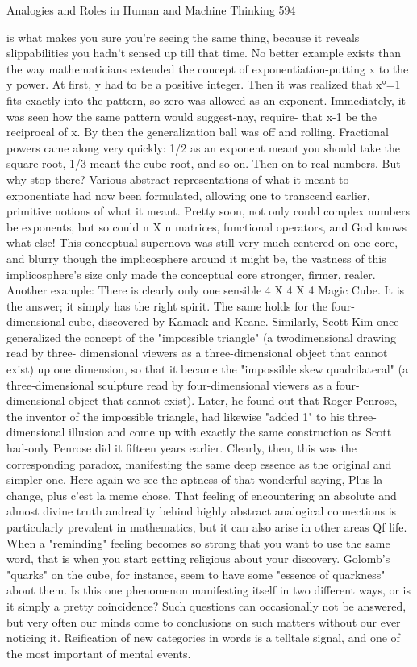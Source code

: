Analogies and Roles in Human and Machine Thinking                                 594

is what makes you sure you're seeing the same thing, because it reveals slippabilities
you hadn't sensed up till that time.
         No better example exists than the way mathematicians extended the concept of
exponentiation-putting x to the y power. At first, y had to be a positive integer. Then
it was realized that x°=1 fits exactly into the pattern, so zero was allowed as an
exponent. Immediately, it was seen how the same pattern would suggest-nay, require-
that x-1 be the reciprocal of x. By then the generalization ball was off and rolling.
Fractional powers came along very quickly: 1/2 as an exponent meant you should take
the square root, 1/3 meant the cube root, and so on. Then on to real numbers. But why
stop there? Various abstract representations of what it meant to exponentiate had now
been formulated, allowing one to transcend earlier, primitive notions of what it meant.
Pretty soon, not only could complex numbers be exponents, but so could n X n
matrices, functional operators, and God knows what else! This conceptual supernova
was still very much centered on one core, and blurry though the implicosphere around
it might be, the vastness of this implicosphere's size only made the conceptual core
stronger, firmer, realer.
         Another example: There is clearly only one sensible 4 X 4 X 4 Magic Cube. It
is the answer; it simply has the right spirit. The same holds for the four-dimensional
cube, discovered by Kamack and Keane. Similarly, Scott Kim once generalized the
concept of the "impossible triangle" (a twodimensional drawing read by three-
dimensional viewers as a three-dimensional object that cannot exist) up one
dimension, so that it became the "impossible skew quadrilateral" (a three-dimensional
sculpture read by four-dimensional viewers as a four-dimensional object that cannot
exist). Later, he found out that Roger Penrose, the inventor of the impossible triangle,
had likewise "added 1" to his three-dimensional illusion and come up with exactly the
same construction as Scott had-only Penrose did it fifteen years earlier. Clearly, then,
this was the corresponding paradox, manifesting the same deep essence as the original
and simpler one. Here again we see the aptness of that wonderful saying, Plus la
change, plus c'est la meme chose.
         That feeling of encountering an absolute and almost divine truth andreality
behind highly abstract analogical connections is particularly prevalent in mathematics,
but it can also arise in other areas Qf life. When a "reminding" feeling becomes so
strong that you want to use the same word, that is when you start getting religious
about your discovery. Golomb's "quarks" on the cube, for instance, seem to have
some "essence of quarkness" about them. Is this one phenomenon manifesting itself in
two different ways, or is it simply a pretty coincidence? Such questions can
occasionally not be answered, but very often our minds come to conclusions on such
matters without our ever noticing it. Reification of new categories in words is a
telltale signal, and one of the most important of mental events.

